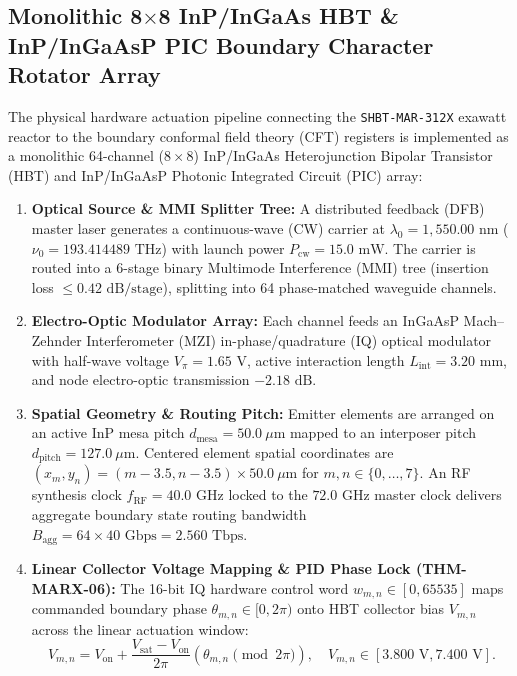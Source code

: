 \documentclass[11pt,onecolumn]{article}
\begin{document}
\subsection{Monolithic \texorpdfstring{8$\times$8}{8x8} InP/InGaAs HBT \& InP/InGaAsP PIC Boundary Character Rotator Array}
\label{subsec:hbt_pic_rotator}
The physical hardware actuation pipeline connecting the \texttt{SHBT-MAR-312X} exawatt reactor to the boundary conformal field theory (CFT) registers is implemented as a monolithic 64-channel ($8 \times 8$) InP/InGaAs Heterojunction Bipolar Transistor (HBT) and InP/InGaAsP Photonic Integrated Circuit (PIC) array:
\begin{enumerate}
    \item \textbf{Optical Source \& MMI Splitter Tree:} A distributed feedback (DFB) master laser generates a continuous-wave (CW) carrier at $\lambda_0 = 1{,}550.00\text{ nm}$ ($\nu_0 = 193.414489\text{ THz}$) with launch power $P_{\text{cw}} = 15.0\text{ mW}$. The carrier is routed into a 6-stage binary Multimode Interference (MMI) tree (insertion loss $\le 0.42\text{ dB/stage}$), splitting into 64 phase-matched waveguide channels.
    \item \textbf{Electro-Optic Modulator Array:} Each channel feeds an InGaAsP Mach--Zehnder Interferometer (MZI) in-phase/quadrature (IQ) optical modulator with half-wave voltage $V_\pi = 1.65\text{ V}$, active interaction length $L_{\text{int}} = 3.20\text{ mm}$, and node electro-optic transmission $-2.18\text{ dB}$.
    \item \textbf{Spatial Geometry \& Routing Pitch:} Emitter elements are arranged on an active InP mesa pitch $d_{\text{mesa}} = 50.0\ \mu\text{m}$ mapped to an interposer pitch $d_{\text{pitch}} = 127.0\ \mu\text{m}$. Centered element spatial coordinates are $(x_m, y_n) = (m - 3.5, n - 3.5) \times 50.0\ \mu\text{m}$ for $m, n \in \{0, \dots, 7\}$. An RF synthesis clock $f_{\text{RF}} = 40.0\text{ GHz}$ locked to the $72.0\text{ GHz}$ master clock delivers aggregate boundary state routing bandwidth $B_{\text{agg}} = 64 \times 40\text{ Gbps} = 2.560\text{ Tbps}$.
    \item \textbf{Linear Collector Voltage Mapping \& PID Phase Lock (THM-MARX-06):} The 16-bit IQ hardware control word $w_{m,n} \in [0, 65535]$ maps commanded boundary phase $\theta_{m,n} \in [0, 2\pi)$ onto HBT collector bias $V_{m,n}$ across the linear actuation window:
    \begin{equation}
    V_{m,n} = V_{\text{on}} + \frac{V_{\text{sat}} - V_{\text{on}}}{2\pi} \left(\theta_{m,n} \pmod{2\pi}\right), \quad V_{m,n} \in [3.800\text{ V}, 7.400\text{ V}].

\end{equation}
\end{enumerate}
\end{document}
